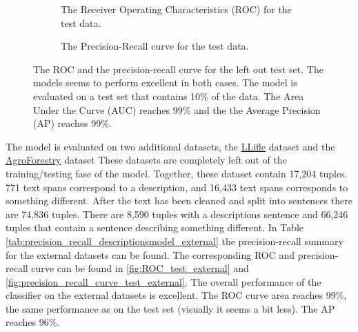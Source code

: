 \documentclass[a4paper, 12pt, oneside]{book} %
\begin{document}
\begin{figure} [h]
     \centering
     \begin{subfigure}[b]{0.49\textwidth}
         \centering
         
         \caption{The Receiver Operating Characteristics (ROC) for the test data.}
         \label{fig:ROC_test}
     \end{subfigure}
     \hfill
     \begin{subfigure}[b]{0.49\textwidth}
         \centering
         
         \caption{The Precision-Recall curve for the test data.}
         \label{fig:precision_recall_curve_test}
     \end{subfigure}
     \caption[ROC and precision recall curves for test set]{The ROC and the precision-recall curve for the left out test set. The models seems to perform excellent in both cases. The model is evaluated on a test set that contains 10\% of the data. The Area Under the Curve (AUC) reaches 99\% and the the Average Precision (AP) reaches 99\%.}
\end{figure}
The model is evaluated on two additional datasets, the \href{http://www.llifle.com/}{LLifle} dataset and the  \href{https://www.worldagroforestry.org/}{AgroForestry} dataset
These datasets are completely left out of the training/testing fase of the model.
Together, these dataset contain 17,204 tuples.
771 text spans correspond to a description, and 16,433 text spans corresponds to something different.
After the text has been cleaned and split into sentences there are 74,836 tuples.
There are 8,590 tuples with a descriptions sentence and 66,246 tuples that contain a sentence describing something different.
In Table \ref{tab:precision_recall_descriptionsmodel_external} the precision-recall summary for the external datasets can be found.
The corresponding ROC and precision-recall curve can be found in \ref{fig:ROC_test_external} and \ref{fig:precision_recall_curve_test_external}.
The overall performance of the classifier on the external datasets is excellent. 
The ROC curve area reaches 99\%, the same performance as on the test set (visually it seems a bit less).
The AP reaches 96\%.
\end{document}
